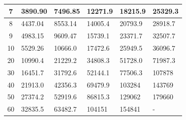\begin{table}[htp]
\begin{tabular}{|c|l|l|l|l|l|}
7                                                                          & 3890.90                              & 7496.85                               & 12271.9                               & 18215.9                               & 25329.3                               \\ \hline
8                                                                          & 4437.04                              & 8553.14                               & 14005.4                               & 20793.9                               & 28918.7                               \\ \hline
9                                                                          & 4983.15                              & 9609.47                               & 15739.1                               & 23371.7                               & 32507.7                               \\ \hline
10                                                                         & 5529.26                              & 10666.0                               & 17472.6                               & 25949.5                               & 36096.7                               \\ \hline
20                                                                         & 10990.4                              & 21229.2                               & 34808.3                               & 51728.0                               & 71987.3                               \\ \hline
30                                                                         & 16451.7                              & 31792.6                               & 52144.1                               & 77506.3                               & 107878                                \\ \hline
40                                                                         & 21913.0                              & 42356.3                               & 69479.9                               & 103284                                & 143769                                \\ \hline
50                                                                         & 27374.2                              & 52919.6                               & 86815.3                               & 129062                                & 179660                                \\ \hline
60                                                                         & 32835.5                              & 63482.7                               & 104151                                & 154841                                & -                                     \\ \hline

\end{tabular}
\end{table}
